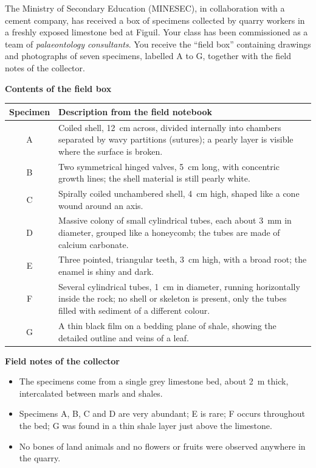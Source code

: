 \documentclass[11pt]{article}
\begin{document}
The Ministry of Secondary Education (MINESEC), in collaboration with a cement company, has received a box of specimens collected by quarry workers in a freshly exposed limestone bed at Figuil. Your class has been commissioned as a team of \emph{palaeontology consultants}. You receive the ``field box'' containing drawings and photographs of seven specimens, labelled A to G, together with the field notes of the collector.

\textbf{Contents of the field box}

\begin{center}
\begin{tabularx}{\linewidth}{|c|X|}
\hline
\rowcolor{popblueL} \textbf{Specimen} & \textbf{Description from the field notebook} \\
\hline
A & Coiled shell, \SI{12}{cm} across, divided internally into chambers separated by wavy partitions (sutures); a pearly layer is visible where the surface is broken. \\
\hline
B & Two symmetrical hinged valves, \SI{5}{cm} long, with concentric growth lines; the shell material is still pearly white. \\
\hline
C & Spirally coiled unchambered shell, \SI{4}{cm} high, shaped like a cone wound around an axis. \\
\hline
D & Massive colony of small cylindrical tubes, each about \SI{3}{mm} in diameter, grouped like a honeycomb; the tubes are made of calcium carbonate. \\
\hline
E & Three pointed, triangular teeth, \SI{3}{cm} high, with a broad root; the enamel is shiny and dark. \\
\hline
F & Several cylindrical tubes, \SI{1}{cm} in diameter, running horizontally inside the rock; no shell or skeleton is present, only the tubes filled with sediment of a different colour. \\
\hline
G & A thin black film on a bedding plane of shale, showing the detailed outline and veins of a leaf. \\
\hline
\end{tabularx}
\end{center}

\textbf{Field notes of the collector}
\begin{itemize}
\item The specimens come from a single grey limestone bed, about \SI{2}{m} thick, intercalated between marls and shales.
\item Specimens A, B, C and D are very abundant; E is rare; F occurs throughout the bed; G was found in a thin shale layer just above the limestone.
\item No bones of land animals and no flowers or fruits were observed anywhere in the quarry.
\end{itemize}
\end{document}
